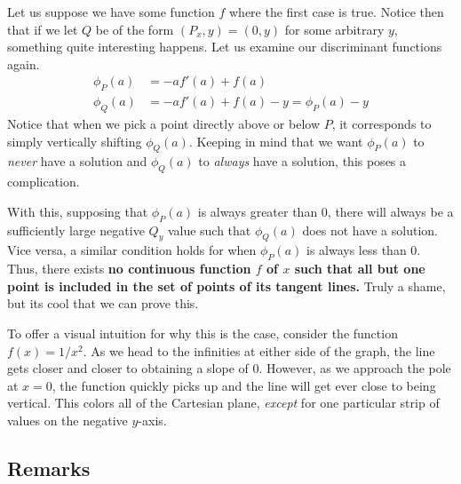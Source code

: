Let us suppose we have some function \( f \) where the first case is true.
Notice then that if we let \( Q \) be of the form \( \left( P_x, y \right) = \left( 0, y \right) \) for some arbitrary \( y \), something quite interesting happens. Let us examine our discriminant functions again.
\begin{align*}
    \phi_P \left( a \right) &= -a f' \left( a \right) + f \left( a \right) \\
    \phi_Q \left( a \right) &= -a f' \left( a \right) + f \left( a \right) - y = \phi_P \left( a \right) - y
\end{align*}
Notice that when we pick a point directly above or below \( P \), it
corresponds to simply vertically shifting \( \phi_Q \left( a \right) \).
Keeping in mind that we want \( \phi_P \left( a \right) \) to \textit{never}
have a solution and \( \phi_Q \left( a \right) \) to \textit{always} have a
solution, this poses a complication.

With this, supposing that \( \phi_P \left( a \right) \) is always greater than
\( 0 \), there will always be a sufficiently large negative \( Q_y \) value
such that \( \phi_Q \left( a \right) \) does not have a solution. Vice versa, a
similar condition holds for when \( \phi_P \left( a \right) \) is always less
than \( 0 \). Thus, there exists \textbf{no continuous function \( f \) of \( x
\) such that all but one point is included in the set of points of its tangent
lines.} Truly a shame, but its cool that we can prove this.

To offer a visual intuition for why this is the case, consider the function \(
f \left( x \right) = 1/x^2 \).  As we head to the infinities at either side of the graph, the line gets closer and closer to obtaining a slope of \( 0 \). However, as we approach the pole at \( x = 0 \), the function quickly picks up and the line will get ever close to being vertical. This colors all of the Cartesian plane, \textit{except} for one particular strip of values on the negative \( y \)-axis.

\subsection{Remarks}

